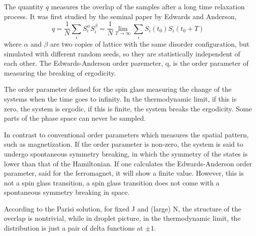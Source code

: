 
The quantity $q$ measures the overlap of the samples after a long time relaxation process. 
It was first studied by the seminal paper by Edwards and Anderson,
\begin{equation}
  \label{eq:q}
  q=\frac{1}{N}\sum_iS_i^\alpha S_i^\beta=\frac{1}{N}\lim_{T\to \infty}\sum_iS_i(t_0)S_i(t_0+T)
\end{equation}
where $\alpha$ and $\beta$ are two copies of lattice with the same disorder 
configuration, but simulated with different random seeds, so they are
statistically independent of each other. The Edwards-Anderson order paremeter, q, 
is the order parameter of measuring the breaking of ergodicity. 

The order parameter defined for the spin glass measuring the change of the systems
when the time goes to infinity. In the thermodynamic limit, if this
is zero, the system is ergodic, if this is finite, the system breaks
the ergodicity. Some parts of the phase space can never be sampled.

In contrast to conventional order parameters which measures the 
spatial pattern, such as magnetization. If the order parameter is non-zero, 
the system is said to undergo spontaneous symmetry breaking, in which the symmetry of 
the states is lower than that of the Hamiltonian. If one calculates
the Edwards-Anderson order parameter, said for the ferromagnet, it will
show a finite value. However, this is not a spin glass transition, a
spin glass transition does not come with a spontaneous symmetry breaking in space.

According to the Parisi solution, for fixed J and (large) N, the structure of 
the overlap is nontrivial, while in droplet picture, in the thermodynamic limit, 
the distribution is just a pair of delta functions at $\pm 1$. 

